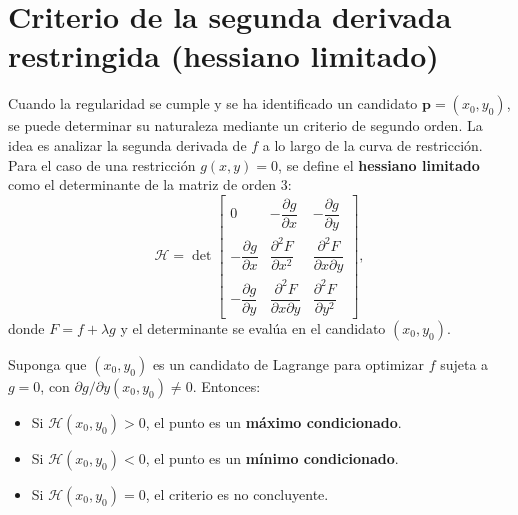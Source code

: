 \section{Criterio de la segunda derivada restringida (hessiano limitado)}

Cuando la regularidad se cumple y se ha identificado un candidato $\mathbf{p}=(x_0,y_0)$, se puede determinar su naturaleza mediante un criterio de segundo orden. La idea es analizar la segunda derivada de $f$ a lo largo de la curva de restricción. Para el caso de una restricción $g(x,y)=0$, se define el \textbf{hessiano limitado} como el determinante de la matriz de orden $3$:
\[
\mathcal{H} =
\det\begin{bmatrix}
0 & -\dfrac{\partial g}{\partial x} & -\dfrac{\partial g}{\partial y} \\[8pt]
-\dfrac{\partial g}{\partial x} & \dfrac{\partial^2 F}{\partial x^2} & \dfrac{\partial^2 F}{\partial x\partial y} \\[8pt]
-\dfrac{\partial g}{\partial y} & \dfrac{\partial^2 F}{\partial x\partial y} & \dfrac{\partial^2 F}{\partial y^2}
\end{bmatrix},
\]
donde $F=f+\lambda g$ y el determinante se evalúa en el candidato $(x_0,y_0)$.

\begin{theorem}
Suponga que $(x_0,y_0)$ es un candidato de Lagrange para optimizar $f$ sujeta a $g=0$, con $\partial g/\partial y(x_0,y_0)\neq0$. Entonces:
\begin{itemize}
    \item Si $\mathcal{H}(x_0,y_0)>0$, el punto es un \textbf{máximo condicionado}.
    \item Si $\mathcal{H}(x_0,y_0)<0$, el punto es un \textbf{mínimo condicionado}.
    \item Si $\mathcal{H}(x_0,y_0)=0$, el criterio es no concluyente.
\end{itemize}
\end{theorem}

